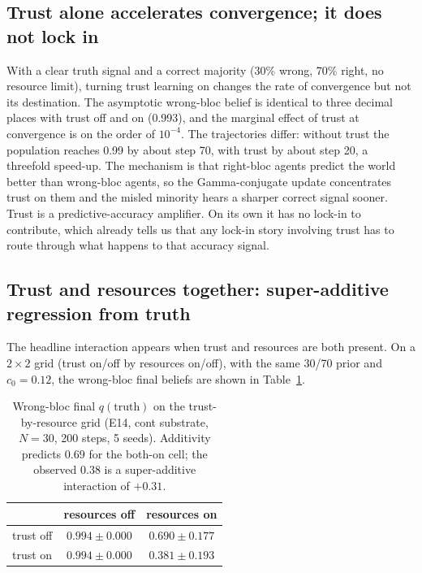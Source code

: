 \documentclass[11pt]{article}
\newcommand{\qtrue}{q(\text{truth})}
\begin{document}
\subsection{Trust alone accelerates convergence; it does not lock in}
\label{sec:trustalone}

With a clear truth signal and a correct majority (30\% wrong, 70\% right, no
resource limit), turning trust learning on changes the rate of convergence but
not its destination. The asymptotic wrong-bloc belief is identical to three
decimal places with trust off and on (0.993), and the marginal effect of trust
at convergence is on the order of $10^{-4}$. The trajectories differ: without
trust the population reaches 0.99 by about step 70, with trust by about step 20,
a threefold speed-up. The mechanism is that right-bloc agents predict the world
better than wrong-bloc agents, so the Gamma-conjugate update concentrates trust
on them and the misled minority hears a sharper correct signal sooner. Trust is
a predictive-accuracy amplifier. On its own it has no lock-in to contribute,
which already tells us that any lock-in story involving trust has to route
through what happens to that accuracy signal.

\subsection{Trust and resources together: super-additive regression from truth}
\label{sec:trustresource}

The headline interaction appears when trust and resources are both present. On
a $2\times 2$ grid (trust on/off by resources on/off), with the same 30/70 prior
and $c_0=0.12$, the wrong-bloc final beliefs are shown in
Table~\ref{tab:e14}.

\begin{table}[t]
\centering
\caption{Wrong-bloc final $\qtrue$ on the trust-by-resource grid (E14, cont
substrate, $N=30$, 200 steps, 5 seeds). Additivity predicts $0.69$ for the
both-on cell; the observed $0.38$ is a super-additive interaction of $+0.31$.}
\label{tab:e14}
\begin{tabular}{lcc}
\toprule
 & resources off & resources on \\
\midrule
trust off & $0.994 \pm 0.000$ & $0.690 \pm 0.177$ \\
trust on  & $0.994 \pm 0.000$ & $\mathbf{0.381 \pm 0.193}$ \\
\bottomrule
\end{tabular}
\end{table}
\end{document}

